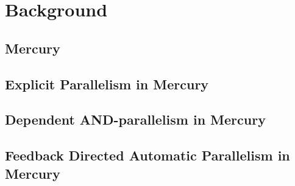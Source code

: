 
\chapter{Background}
\label{chap:background}

\section{Mercury}
\label{sec:backgnd_mercury}


\section{Explicit Parallelism in Mercury}
\label{sec:backgnd_merpar}


\section{Dependent AND-parallelism in Mercury}
\label{sec:backgnd_deppar}


\section{Feedback Directed Automatic Parallelism in Mercury}
\label{sec:backgnd_autopar}



